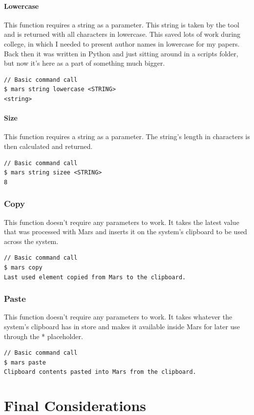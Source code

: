 \documentclass{report}
\begin{document}
\subsubsection{Lowercase}
This function requires a string as a parameter. This string is taken by the tool and is returned with all characters in lowercase. This saved lots of work during college, in which I needed to present author names in lowercase for my papers. Back then it was written in Python and just sitting around in a scripts folder, but now it's here as a part of something much bigger.
\begin{lstlisting}
// Basic command call
$ mars string lowercase <STRING>
<string>
\end{lstlisting}

\subsubsection{Size}
This function requires a string as a parameter. The string's length in characters is then calculated and returned.
\begin{lstlisting}
// Basic command call
$ mars string sizee <STRING>
8
\end{lstlisting}


\subsection{Copy}
This function doesn't require any parameters to work. It takes the latest value that was processed with Mars and inserts it on the system's clipboard to be used across the system.
\begin{lstlisting}
// Basic command call
$ mars copy
Last used element copied from Mars to the clipboard.
\end{lstlisting}

\subsection{Paste}
This function doesn't require any parameters to work. It takes whatever the system's clipboard has in store and makes it available inside Mars for later use through the * placeholder.
\begin{lstlisting}
// Basic command call
$ mars paste
Clipboard contents pasted into Mars from the clipboard.
\end{lstlisting}

\chapter{Final Considerations}
\end{document}
